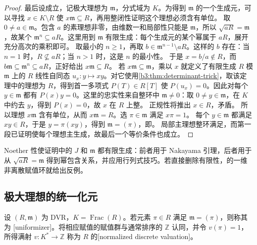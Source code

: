 \begin{proof}
	最后设成立，记极大理想为 \(\mathfrak m\)，分式域为 \(K\)。为得到 \(\mathfrak m\) 的一个生成元，可以寻找 \(x\in K\setminus R\) 使 \(x\mathfrak m\subseteq R\)，再用整闭性证明这个理想必须含有单位。 取 \(0\ne a\in\mathfrak m\)。包含 \(a\) 的素理想非零，由维数一和局部性只能是 \(\mathfrak m\)，所以 \(\sqrt{aR}=\mathfrak m\)，故某个 \(\mathfrak m^n\subseteq aR\)。这里用到 \(\mathfrak m\) 有限生成：每个生成元的某个幂属于 \(aR\)，展开充分高次的乘积即可。 取最小的 \(n\ge1\)，再取 \(b\in\mathfrak m^{n-1}\setminus aR\)。这样的 \(b\) 存在：当 \(n=1\) 时，\(R\not\subseteq aR\)；当 \(n>1\) 时，这是 \(n\) 的最小性。 于是 \(x=b/a\notin R\)，而 \(b\mathfrak m\subseteq\mathfrak m^n\subseteq aR\)，正好给出 \(x\mathfrak m\subseteq R\)。 若 \(x\mathfrak m\subseteq\mathfrak m\)，乘以 \(x\) 就定义了有限生成 \(R\) 模 \(\mathfrak m\) 上的 \(R\) 线性自同态 \(u_x:y\mapsto xy\)。对它使用\cref{b3:thm:determinant-trick}，取该定理中的理想为 \(R\)，得到首一多项式 \(P(T)\in R[T]\) 使 \(P(u_x)=0\)。因此对每个 \(y\in\mathfrak m\) 都有 \(P(x)y=0\)。这里的忠实性来自整环中 \(\mathfrak m\ne0\)：取 \(0\ne y\in\mathfrak m\)，在 \(K\) 中约去 \(y\)，得到 \(P(x)=0\)，故 \(x\) 在 \(R\) 上整。 正规性将推出 \(x\in R\)，矛盾。 所以理想 \(x\mathfrak m\) 含有单位，从而 \(x\mathfrak m=R\)。选 \(\pi\in\mathfrak m\) 满足 \(x\pi=1\)。 每个 \(y\in\mathfrak m\) 都满足 \(xy\in R\)，于是 \(y=\pi(xy)\)，得到 \(\mathfrak m=(\pi)\)，即。 局部主理想整环满足，而第一段已证明使每个理想主生成，故最后一个等价条件也成立。
\end{proof}

Noether 性使证明中的 \(J\) 和 \(\mathfrak m\) 都有限生成：前者用于 Nakayama 引理，后者用于从 \(\sqrt{aR}=\mathfrak m\) 得到幂包含关系，并应用行列式技巧。若直接删除有限性，的一维非离散赋值环就给出反例。

\subsection{极大理想的统一化元}
\label{b3:subsec:1002:02}

\begin{definition}\label{b3:def:uniformizer}
	设 \((R,\mathfrak m)\) 为 DVR，\(K=\operatorname{Frac}(R)\)。若元素 \(\pi\in R\) 满足 \(\mathfrak m=(\pi)\)，则称其为 [uniformizer]。将相应赋值的赋值群与通常排序的 \(\mathbb Z\) 认同，并令 \(v(\pi)=1\)，所得满射 \(v:K^*\to\mathbb Z\) 称为 \(R\) 的[normalized discrete valuation]。
\end{definition}

